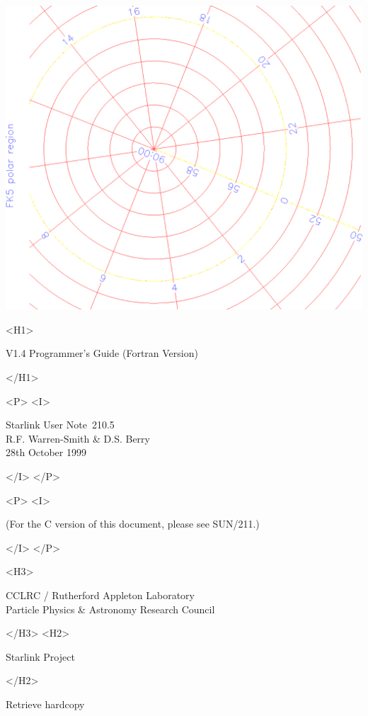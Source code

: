 \documentclass[twoside,11pt]{article}
\newcommand{\stardoccategory}  {Starlink User Note}
\newcommand{\stardocsource}    {sun\stardocnumber}
\newcommand{\stardocnumber}    {210.5}
\newcommand{\stardocauthors}   {R.F. Warren-Smith \& D.S. Berry}
\newcommand{\stardocdate}      {28th October 1999}
\newcommand{\stardocversion}   {V1.4}
\newcommand{\stardocmanualhtml}{Programmer's Guide (Fortran Version)}
\newcommand{\htmladdnormallink}[2]{#1}
\newcommand{\htmladdimg}[1]{}
\newcommand{\xref}[3]{#1}
\begin{document}
\begin{htmlonly}
   \includegraphics[scale=0.3,angle=-90]{sun210_figures/frontc.eps}

   \begin{rawhtml} <H1> \end{rawhtml}
      \stardocversion
      \stardocmanualhtml
   \begin{rawhtml} </H1> \end{rawhtml}
   \begin{rawhtml} <P> <I> \end{rawhtml}
   \stardoccategory\ \stardocnumber \\
   \stardocauthors \\
   \stardocdate
   \begin{rawhtml} </I> </P> \end{rawhtml}
   \begin{rawhtml} <P> <I> \end{rawhtml}
   (For the C version of this document, please see \xref{SUN/211}{sun211}{}.)
   \begin{rawhtml} </I> </P> \end{rawhtml}
   \begin{rawhtml} <H3> \end{rawhtml}
      \htmladdnormallink{CCLRC}{http://www.cclrc.ac.uk} /
      \htmladdnormallink{Rutherford Appleton Laboratory}
                        {http://www.cclrc.ac.uk/ral} \\
      \htmladdnormallink{Particle Physics \& Astronomy Research Council}
                        {http://www.pparc.ac.uk} \\
   \begin{rawhtml} </H3> <H2> \end{rawhtml}
      \htmladdnormallink{Starlink Project}{http://www.starlink.rl.ac.uk/}
   \begin{rawhtml} </H2> \end{rawhtml}
   \htmladdnormallink{\htmladdimg{source.gif} Retrieve hardcopy}
      {http://www.starlink.rl.ac.uk/cgi-bin/hcserver?\stardocsource}\\


\end{htmlonly}
\end{document}
